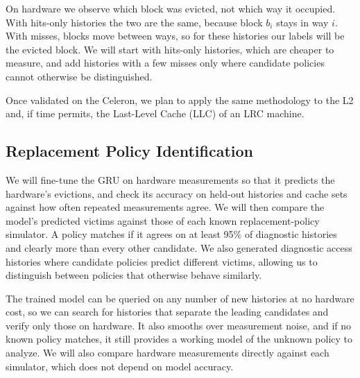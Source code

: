 On hardware we observe which block was evicted, not which
way it occupied. With hits-only histories the two are the
same, because block $b_i$ stays in way $i$. With misses,
blocks move between ways, so for these histories our labels
will be the evicted block. We will start with hits-only
histories, which are cheaper to measure, and add histories
with a few misses only where candidate policies cannot
otherwise be distinguished.

Once validated on the Celeron, we plan to apply
the same methodology to the L2 and, if time permits, the
Last-Level Cache (LLC) of an LRC machine.

\subsection{Replacement Policy Identification}

We will fine-tune the GRU on hardware measurements so that
it predicts the hardware's evictions, and check its accuracy
on held-out histories and cache sets against how often
repeated measurements agree. We will then compare the
model's predicted victims against those of each known
replacement-policy simulator. A policy matches if it agrees
on at least 95\% of diagnostic histories and clearly more
than every other candidate. We also generated diagnostic access
histories where candidate policies predict different
victims, allowing us to distinguish between policies
that otherwise behave similarly.

The trained model can be queried on any number of new
histories at no hardware cost, so we can search for
histories that separate the leading candidates and verify
only those on hardware. It also smooths over measurement
noise, and if no known policy matches, it still provides a
working model of the unknown policy to analyze. We will
also compare hardware measurements directly against each
simulator, which does not depend on model accuracy.